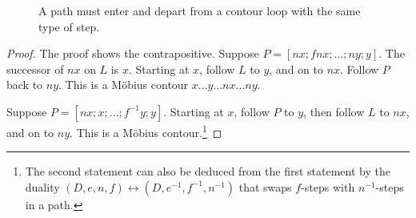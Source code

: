 \begin{figure}[htb]
\centering
{}
\caption{A path must enter and depart from a contour loop with the
same type of step.}
\label{fig:interior_nf}
\end{figure}


\begin{proof} The proof shows the contrapositive.  Suppose $P=[n x;f n
x;\ldots;n y;y]$.  The successor of $n x$ on $L$ is $x$.  Starting
at $x$, follow $L$ to $y$, and on to $n x$.  Follow $P$ back to $n
y$.
This is a M\"obius contour $x\ldots y\ldots n x\ldots n y$.

Suppose $P=[n x;x;\ldots;f^{-1} y;y]$.  Starting at $x$, follow $P$ to
$y$, then follow $L$ to $n x$, and on to $n y$.  This is a M\"obius
contour.\footnote{The second statement can also be deduced from the first statement
by the duality $(D,e,n,f)\leftrightarrow (D,e^{-1},f^{-1},n^{-1})$ that swaps
$f$-steps with $n^{-1}$-steps in a path.}
\end{proof}


%


